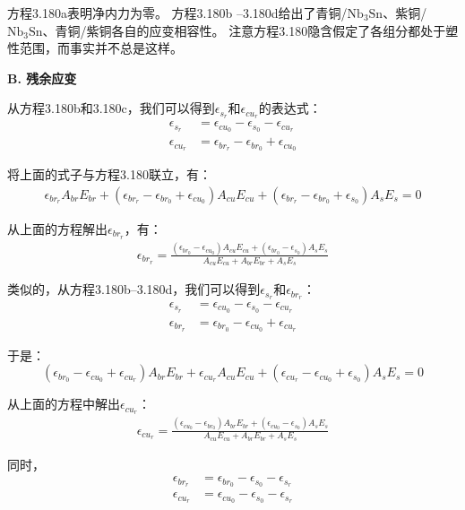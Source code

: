 方程3.180a表明净内力为零。
方程3.180b –3.180d给出了青铜/$\mathrm{Nb_3Sn}$、紫铜/$\mathrm{Nb_3Sn}$、青铜/紫铜各自的应变相容性。
注意方程3.180隐含假定了各组分都处于塑性范围，而事实并不总是这样。

\textbf{B. 残余应变}

从方程3.180b和3.180c，我们可以得到$\epsilon_{s_r}$和$\epsilon_{cu_r}$的表达式：
\begin{align*}%
\epsilon_{s_r}&=\epsilon_{cu_0}-\epsilon_{s_0}-\epsilon_{cu_r}\\
\epsilon_{cu_r}&=\epsilon_{br_r}-\epsilon_{br_0}+\epsilon_{cu_0}
\end{align*}

将上面的式子与方程3.180联立，有：
\begin{align*}
\epsilon_{br_r}A_{br}E_{br}+(\epsilon_{br_r}-\epsilon_{br_0}+\epsilon_{cu_0})A_{cu}E_{cu}+(\epsilon_{br_r}-\epsilon_{br_0}+\epsilon_{s_0})A_sE_s=0
\end{align*}

从上面的方程解出$\epsilon_{br_r}$，有：
 \begin{align}%
\epsilon_{br_r}=\frac{(\epsilon_{br_0}-\epsilon_{cu_0})A_{cu}E_{cu}+(\epsilon_{br_0}-\epsilon_{s_0})A_sE_s}{A_{cu}E_{cu}+A_{br}E_{br}+A_{s}E_{s}}
\end{align}

类似的，从方程3.180b–3.180d，我们可以得到$\epsilon_{s_r}$和$\epsilon_{br_r}$：
\begin{align*}
\epsilon_{s_r}&=\epsilon_{cu_0}-\epsilon_{s_0}-\epsilon_{cu_r}\\
\epsilon_{br_r}&=\epsilon_{br_0}-\epsilon_{cu_0}+\epsilon_{cu_r}
\end{align*}

于是：
\begin{equation*}
(\epsilon_{br_0}-\epsilon_{cu_0}+\epsilon_{cu_r})A_{br}E_{br}+\epsilon_{cu_r}A_{cu}E_{cu}+(\epsilon_{cu_r}-\epsilon_{cu_0}+\epsilon_{s_0})A_sE_s=0
\end{equation*}

从上面的方程中解出$\epsilon_{cu_r}$：
\begin{align*}%
\epsilon_{cu_r}=\frac{(\epsilon_{cu_0}-\epsilon_{br_0})A_{br}E_{br}+(\epsilon_{cu_0}-\epsilon_{s_0})A_sE_s}{A_{cu}E_{cu}+A_{br}E_{br}+A_{s}E_{s}}\tag{3.181b}
\end{align*}

同时，
\begin{align*}
\epsilon_{br_r}&=\epsilon_{br_0}-\epsilon_{s_0}-\epsilon_{s_r}\\
\epsilon_{cu_r}&=\epsilon_{cu_0}-\epsilon_{s_0}-\epsilon_{s_r}
\end{align*}

